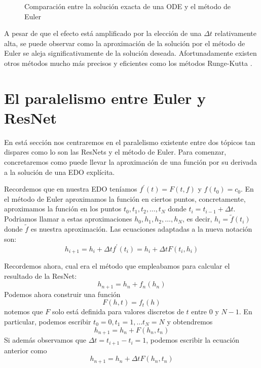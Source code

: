 \documentclass[12pt]{report}
\begin{document}
\begin{figure}[H]
    \centering
    \caption{Comparación entre la solución exacta de una ODE y el método de
    Euler}
\end{figure}

A pesar de que el efecto está amplificado por la elección de una $\Delta t$
relativamente alta, se puede observar como la aproximación de la solución por el
método de Euler se aleja significativamente de la solución deseada.
Afortunadamente existen otros métodos mucho más precisos y eficientes como los
métodos Runge-Kutta \cite{wrk}.

\section{El paralelismo entre Euler y ResNet}

En está sección nos centraremos en el paralelismo existente entre dos tópicos
tan dispares como lo son las ResNets y el método de Euler. Para comenzar,
concretaremos como puede llevar la aproximación de una función por su derivada a
la solución de una EDO explícita.

Recordemos que en nuestra EDO teníamos $f^\prime(t) = F(t, f)$ y $f(t_0) = c_0$.
En el método de Euler aproximamos la función en ciertos puntos, concretamente,
aproximamos la función en los puntos $t_0, t_1, t_2, \dots, t_N$ donde $t_i =
t_{i-1} + \Delta t$. Podriamos llamar a estas aproximaciones $h_0, h_1, h_2, \dots, h_N$,
es decir, $h_i = \tilde{f}(t_i)$ donde $\tilde{f}$ es nuestra aproximación. Las
ecuaciones adaptadas a la nueva notación son:
\begin{equation}
    \label{eq:euler}
    h_{i+1} = h_i + \Delta t f^\prime(t_i) = h_i + \Delta t F(t_i, h_i)
\end{equation}

Recordemos ahora, cual era el método que empleabamos para calcular el resultado
de la ResNet:
\[
    h_{n+1} = h_n + f_n(h_n)
\]
Podemos ahora construir una función
\[
    F(h, t) = f_t(h)
\]
notemos que $F$ solo está definida para valores discretos de $t$ entre $0$ y
$N-1$. En particular, podemos escribir $t_0 = 0, t_1 = 1, \dots t_N = N$ y
obtendremos
\[
    h_{n+1} = h_n + F(h_n, t_n)
\]
Si además observamos que $\Delta t = t_{i+1} - t_i = 1$, podemos escribir la
ecuación anterior como
\begin{equation}
    \label{eq:resnet}
    h_{n+1} = h_n + \Delta t F(h_n, t_n)
\end{equation}
\end{document}

